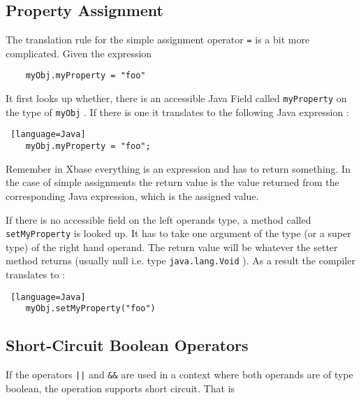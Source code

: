 \documentclass[a4paper,10pt]{scrreprt}
\begin{document}
\subsection{Property Assignment\label{propertyAssignment}}
The translation rule for the simple assignment operator \lstinline{=}
 is a bit more complicated.
Given the expression 

\begin{lstlisting}
	myObj.myProperty = "foo"

\end{lstlisting}


It first looks up whether, there is an accessible Java Field called \lstinline{myProperty}
 on the type of \lstinline{myObj}
. If there is one it translates to
the following Java expression :

\begin{lstlisting} [language=Java]
	myObj.myProperty = "foo";

\end{lstlisting}


Remember in Xbase everything is an expression and has to return something. In the case of simple assignments the return value is the value returned from the corresponding
Java expression, which is the assigned value.

If there is no accessible field on the left operands type, a method called \lstinline{setMyProperty}
 is looked up. It has to take one argument of the type (or a super type) of the right hand operand.
The return value will be whatever the setter method returns (usually null i.e. type \lstinline{java.lang.Void}
). 
As a result the compiler translates to :

\begin{lstlisting} [language=Java]
	myObj.setMyProperty("foo")

\end{lstlisting}





\subsection{Short-Circuit Boolean Operators}
If the operators \lstinline{||}
 and \lstinline{&&}
 are used in a context where both operands are of type boolean, the operation supports short circuit.
That is 
\end{document}
